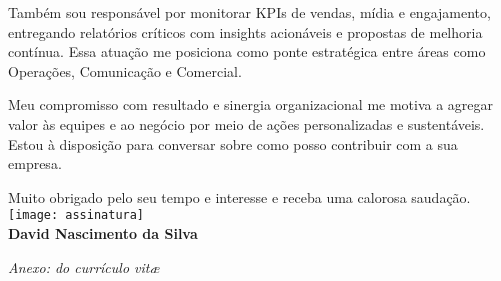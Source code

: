 \begin{commentA}
\noindent Também sou responsável por monitorar KPIs de vendas, mídia e engajamento, entregando relatórios críticos com insights acionáveis e propostas de melhoria contínua. Essa atuação me posiciona como ponte estratégica entre áreas como Operações, Comunicação e Comercial.

\vspace{1.5em} %
Meu compromisso com resultado e sinergia organizacional me motiva a agregar valor às equipes e ao negócio por meio de ações personalizadas e sustentáveis. Estou à disposição para conversar sobre como posso contribuir com a sua empresa.

\raggedleft%
Muito obrigado pelo seu tempo e interesse e receba uma calorosa saudação.\\[0.1em]
\texttt{[image: assinatura]}\\[-0.1em]
{\bfseries David Nascimento da Silva}~~~~~~~~~~~\vspace*{-0.5em}
%
\vfill%
\raggedright%
{\slshape Anexo: do currículo vit\ae{}}%
\end{commentA}
